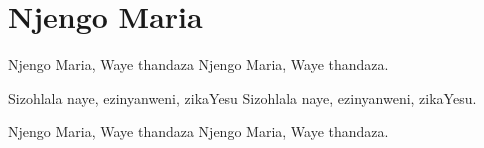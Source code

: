 \starttocol
\chapter{Njengo Maria}
\nexttocol
\hfill{\it }
\stoptocol
\starttocol
\startlines
{\sc Njengo} Maria, Waye thandaza
Njengo Maria, Waye thandaza.

Sizohlala naye, ezinyanweni, zikaYesu
Sizohlala naye, ezinyanweni, zikaYesu.

Njengo Maria, Waye thandaza
Njengo Maria, Waye thandaza.

\stoplines
\nexttocol

\stoptocol
